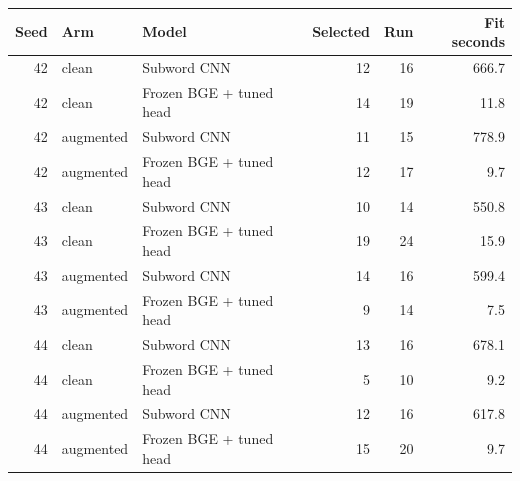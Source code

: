 \begin{tabular}{rllrrr}
\toprule
Seed & Arm & Model & Selected & Run & Fit seconds \\
\midrule
42 & clean & Subword CNN & 12 & 16 & 666.7 \\
42 & clean & Frozen BGE + tuned head & 14 & 19 & 11.8 \\
42 & augmented & Subword CNN & 11 & 15 & 778.9 \\
42 & augmented & Frozen BGE + tuned head & 12 & 17 & 9.7 \\
43 & clean & Subword CNN & 10 & 14 & 550.8 \\
43 & clean & Frozen BGE + tuned head & 19 & 24 & 15.9 \\
43 & augmented & Subword CNN & 14 & 16 & 599.4 \\
43 & augmented & Frozen BGE + tuned head & 9 & 14 & 7.5 \\
44 & clean & Subword CNN & 13 & 16 & 678.1 \\
44 & clean & Frozen BGE + tuned head & 5 & 10 & 9.2 \\
44 & augmented & Subword CNN & 12 & 16 & 617.8 \\
44 & augmented & Frozen BGE + tuned head & 15 & 20 & 9.7 \\
\bottomrule
\end{tabular}
